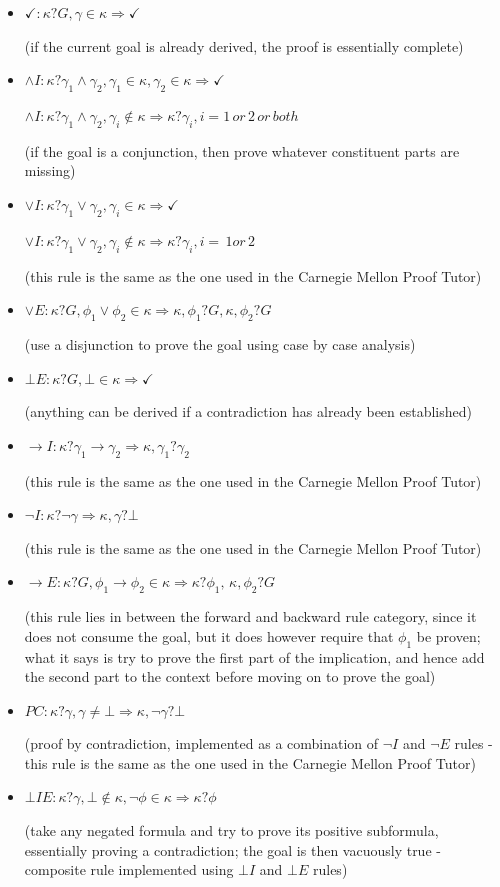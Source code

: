 \documentclass[11pt,twoside,a4paper]{report}
\begin{document}
\begin{itemize}
\item
$\checkmark: \kappa?G, \gamma\in\kappa \Rightarrow \checkmark$

(if the current goal is already derived, the proof is essentially complete)
\item
$\wedge I: \kappa?\gamma_1\wedge\gamma_2, \gamma_1\in\kappa, \gamma_2\in\kappa \Rightarrow \checkmark$

$\wedge I: \kappa?\gamma_1\wedge\gamma_2, \gamma_i\notin\kappa \Rightarrow \kappa?\gamma_i, i = 1\, or\, 2\, or\, both$

(if the goal is a conjunction, then prove whatever constituent parts are missing)
\item
$\vee I: \kappa?\gamma_1\vee\gamma_2, \gamma_i\in\kappa \Rightarrow \checkmark$

$\vee I: \kappa?\gamma_1\vee\gamma_2, \gamma_i\notin\kappa \Rightarrow \kappa?\gamma_i, i = \,1 or\, 2$

(this rule is the same as the one used in the Carnegie Mellon Proof Tutor)
\item
$\vee E: \kappa?G, \phi_1\vee\phi_2\in\kappa \Rightarrow \kappa,\phi_1?G, \kappa,\phi_2?G$

(use a disjunction to prove the goal using case by case analysis)
\item
$\bot E: \kappa?G, \bot\in\kappa \Rightarrow \checkmark$

(anything can be derived if a contradiction has already been established)
\item
$\rightarrow I: \kappa?\gamma_1\rightarrow\gamma_2 \Rightarrow \kappa,\gamma_1?\gamma_2$

(this rule is the same as the one used in the Carnegie Mellon Proof Tutor)
\item
$\neg I: \kappa?\neg\gamma \Rightarrow \kappa,\gamma?\bot$

(this rule is the same as the one used in the Carnegie Mellon Proof Tutor)
\item
$\rightarrow E: \kappa?G, \phi_1\rightarrow\phi_2\in\kappa \Rightarrow \kappa?\phi_1,\, \kappa,\phi_2?G$

(this rule lies in between the forward and backward rule category, since it does not consume the goal, but it does however require that $\phi_1$ be proven; what it says is try to prove the first part of the implication, and hence add the second part to the context before moving on to prove the goal)
\item
$PC: \kappa?\gamma, \gamma\neq\bot \Rightarrow \kappa,\neg\gamma?\bot$

(proof by contradiction, implemented as a combination of $\neg I$ and $\neg E$ rules - this rule is the same as the one used in the Carnegie Mellon Proof Tutor)

\item
$\bot IE: \kappa?\gamma, \bot\notin\kappa, \neg\phi\in\kappa \Rightarrow \kappa?\phi$

(take any negated formula and try to prove its positive subformula, essentially proving a contradiction; the goal is then vacuously true - composite rule implemented using $\bot I$ and $\bot E$ rules)
\end{itemize}
\end{document}
